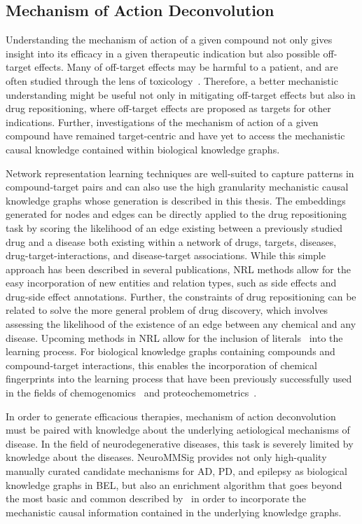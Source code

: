 \subsection{Mechanism of Action Deconvolution}

Understanding the mechanism of action of a given compound not only gives insight into its efficacy in a given therapeutic indication but also possible off-target effects.
Many of off-target effects may be harmful to a patient, and are often studied through the lens of toxicology~\cite{Lee2013}.
Therefore, a better mechanistic understanding might be useful not only in mitigating off-target effects but also in drug repositioning, where off-target effects are proposed as targets for other indications.
Further, investigations of the mechanism of action of a given compound have remained target-centric and have yet to access the mechanistic causal knowledge contained within biological knowledge graphs.

Network representation learning techniques are well-suited to capture patterns in compound-target pairs and can also use the high granularity mechanistic causal knowledge graphs whose generation is described in this thesis.
The embeddings generated for nodes and edges can be directly applied to the drug repositioning task by scoring the likelihood of an edge existing between a previously studied drug and a disease both existing within a network of drugs, targets, diseases, drug-target-interactions, and disease-target associations.
While this simple approach has been described in several publications, \ac{NRL} methods allow for the easy incorporation of new entities and relation types, such as side effects and drug-side effect annotations.
Further, the constraints of drug repositioning can be related to solve the more general problem of drug discovery, which involves assessing the likelihood of the existence of an edge between any chemical and any disease.
Upcoming methods in \ac{NRL} allow for the inclusion of literals~\cite{Kristiadi2018} into the learning process.
For biological knowledge graphs containing compounds and compound-target interactions, this enables the incorporation of chemical fingerprints into the learning process that have been previously successfully used in the fields of chemogenomics~\cite{Vass2016,Schneider2018} and proteochemometrics~\cite{VanWesten2011}.

In order to generate efficacious therapies, mechanism of action deconvolution must be paired with knowledge about the underlying aetiological mechanisms of disease.
In the field of neurodegenerative diseases, this task is severely limited by knowledge about the diseases.
NeuroMMSig provides not only high-quality manually curated candidate mechanisms for \ac{AD}, \ac{PD}, and epilepsy as biological knowledge graphs in \ac{BEL}, but also an enrichment algorithm that goes beyond the most basic and common described by~\cite{Khatri2012} in order to incorporate the mechanistic causal information contained in the underlying knowledge graphs.

